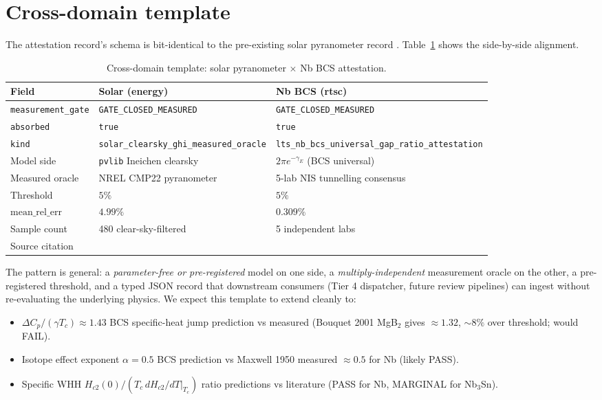 \documentclass[11pt,a4paper]{article}
\newcommand{\gateclosedmeas}{\texttt{GATE\_CLOSED\_MEASURED}}
\begin{document}
\section{Cross-domain template}
\label{sec:cross-domain}

The attestation record's schema is bit-identical to the pre-existing
solar pyranometer record \cite{nrelmidc,pvlib2024}. Table~\ref{tab:cross-domain}
shows the side-by-side alignment.

\begin{table}[h]
\centering
\caption{Cross-domain template: solar pyranometer $\times$ Nb BCS attestation.}
\label{tab:cross-domain}
\small
\begin{tabular}{lll}
\toprule
Field & Solar (energy) & Nb BCS (rtsc) \\
\midrule
\texttt{measurement\_gate} & \gateclosedmeas & \gateclosedmeas \\
\texttt{absorbed} & \texttt{true} & \texttt{true} \\
\texttt{kind} & \texttt{solar\_clearsky\_ghi\_measured\_oracle}
        & \texttt{lts\_nb\_bcs\_universal\_gap\_ratio\_attestation} \\
Model side & \texttt{pvlib} Ineichen clearsky
        & \(2\pi e^{-\gamma_{E}}\) (BCS universal) \\
Measured oracle & NREL CMP22 pyranometer
        & 5-lab NIS tunnelling consensus \\
Threshold & \(5\%\) & \(5\%\) \\
\(\mathrm{mean\_rel\_err}\) & \(4.99\%\) & \(0.309\%\) \\
Sample count & 480 clear-sky-filtered & 5 independent labs \\
Source citation & \cite{nrelmidc,pvlib2024}
        & \cite{bcs1957,giaever1960,townsend1962,schwidtal1969,lichtenberg1989,tinkham1996} \\
\bottomrule
\end{tabular}
\end{table}

The pattern is general: a \emph{parameter-free or pre-registered}
model on one side, a \emph{multiply-independent} measurement oracle
on the other, a pre-registered threshold, and a typed JSON record
that downstream consumers (Tier 4 dispatcher, future review pipelines)
can ingest without re-evaluating the underlying physics. We expect
this template to extend cleanly to:
\begin{itemize}
\item \(\Delta C_{p}/(\gamma T_{c}) \approx 1.43\) BCS specific-heat
  jump prediction vs measured (Bouquet 2001 MgB$_2$ gives
  \(\approx 1.32\), \(\sim\!\!8\%\) over threshold; would FAIL).
\item Isotope effect exponent \(\alpha = 0.5\) BCS prediction vs Maxwell
  1950 measured \(\approx 0.5\) for Nb (likely PASS).
\item Specific WHH \(H_{c2}(0)/(T_{c}\,dH_{c2}/dT|_{T_c})\) ratio
  predictions vs literature (PASS for Nb, MARGINAL for Nb$_3$Sn).
\end{itemize}
\end{document}
